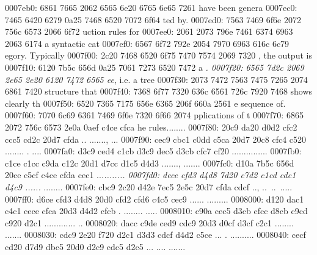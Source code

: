 \begin{bo
00010e0: 7865 647d 5c62 6567 696e 7b76 6572 6261  xed}
\begin{verba
00010f0: 7469 6d7d 0a20 2023 7479 7065 2074 6572  tim}
\begin{
0001c40: 7665 7262 6174 696d 7d0a 2020 236c 6574  verbatim}
\begin{boxe
00027a0: 647d 5c62 6567 696e 7b76 6572 6261 7469  d}
\begin{verbati
00027b0: 6d7d 0a20 2023 6c65 7420 696e 6669 7865  m}
\begin{v
0002c60: 6572 6261 7469 6d7d 0a20 2023 6c65 7420  erbatim}
\begin{
0002dc0: 7665 7262 6174 696d 7d0a 2020 236c 6574  verbatim}
\begin{boxed
0002f30: 7d5c 6265 6769 6e7b 7665 7262 6174 696d  }
\begin{verbatim
0002f40: 7d0a 2020 236c 6574 2068 6428 683a 3a74  }
\begin{v
0003e60: 6572 6261 7469 6d7d 0a20 2023 236f 7065  erbatim}
\begin{boxed
00042b0: 7d5c 6265 6769 6e7b 7665 7262 6174 696d  }
\begin{verbatim
00042c0: 7d0a 2020 2328 782c 7429 3b3b 0a20 202d  }
\begin{boxed}
0007eb0: 6861 7665 2062 6565 6e20 6765 6e65 7261  have been genera
0007ec0: 7465 6420 6279 0a25 7468 6520 7072 6f64  ted by.%
0007ed0: 7563 7469 6f6e 2072 756c 6573 2066 6f72  uction rules for
0007ee0: 2061 2073 796e 7461 6374 6963 2063 6174   a syntactic cat
0007ef0: 6567 6f72 792e 2054 7970 6963 616c 6c79  egory. Typically
0007f00: 2c20 7468 6520 6f75 7470 7574 2069 7320  , the output is 
0007f10: 6120 7b5c 656d 0a25 7061 7273 6520 7472  a {\em.%
0007f20: 6565 7d2c 2069 2e65 2e20 6120 7472 6565  ee}, i.e. a tree
0007f30: 2073 7472 7563 7475 7265 2074 6861 7420   structure that 
0007f40: 7368 6f77 7320 636c 6561 726c 7920 7468  shows clearly th
0007f50: 6520 7365 7175 656e 6365 206f 660a 2561  e sequence of.%
0007f60: 7070 6c69 6361 7469 6f6e 7320 6f66 2074  pplications of t
0007f70: 6865 2072 756c 6573 2e0a 0aef c4ce cfca  he rules........
0007f80: 20c9 da20 d0d2 cfc2 ccc5 cd2c 20d7 cfda   .. ......., ...
0007f90: cec9 cbc1 c0dd c5ca 20d7 20c8 cfc4 c520  ........ . .... 
0007fa0: d3c9 ced4 c1cb d3c9 dec5 d3cb cfc7 cf20  ............... 
0007fb0: c1ce c1cc c9da c12c 20d1 d7cc d1c5 d4d3  ......., .......
0007fc0: d10a 7b5c 656d 20ce c5cf c4ce cfda cec1  ..{\em .........
0007fd0: dece cfd3 d4d8 7d20 c7d2 c1cd cdc1 d4c9  ......} ........
0007fe0: cbc9 2c20 d42e 7ec5 2e5c 20d7 cfda cdcf  .., ..~..\ .....
0007ff0: d6ce cfd3 d4d8 20d0 cfd2 cfd6 c4c5 cec9  ...... .........
0008000: d120 dac1 c4c1 cece cfca 20d3 d4d2 cfcb  . ........ .....
0008010: c90a cec5 d3cb cfcc d8cb c9cd c920 d2c1  ............. ..
0008020: dacc c9de ced9 cdc9 20d3 d0cf d3cf c2c1  ........ .......
0008030: cdc9 2e20 f720 d2c1 d3d3 cdcf d4d2 c5ce  ... . ..........
0008040: cecf cd20 d7d9 dbc5 20d0 d2c9 cdc5 d2c5  ... .... .......

\end{boxed}
\end{verbatim
00042c0: 7d0a 2020 2328 782c 7429 3b3b 0a20 202d  }
\end{boxed
00042b0: 7d5c 6265 6769 6e7b 7665 7262 6174 696d  }
\end{v
0003e60: 6572 6261 7469 6d7d 0a20 2023 236f 7065  erbatim}
\end{verbatim
0002f40: 7d0a 2020 236c 6574 2068 6428 683a 3a74  }
\end{boxed
0002f30: 7d5c 6265 6769 6e7b 7665 7262 6174 696d  }
\end{
0002dc0: 7665 7262 6174 696d 7d0a 2020 236c 6574  verbatim}
\end{v
0002c60: 6572 6261 7469 6d7d 0a20 2023 6c65 7420  erbatim}
\end{verbati
00027b0: 6d7d 0a20 2023 6c65 7420 696e 6669 7865  m}
\end{boxe
00027a0: 647d 5c62 6567 696e 7b76 6572 6261 7469  d}
\end{
0001c40: 7665 7262 6174 696d 7d0a 2020 236c 6574  verbatim}
\end{verba
00010f0: 7469 6d7d 0a20 2023 7479 7065 2074 6572  tim}
\end{bo
00010e0: 7865 647d 5c62 6567 696e 7b76 6572 6261  xed}

